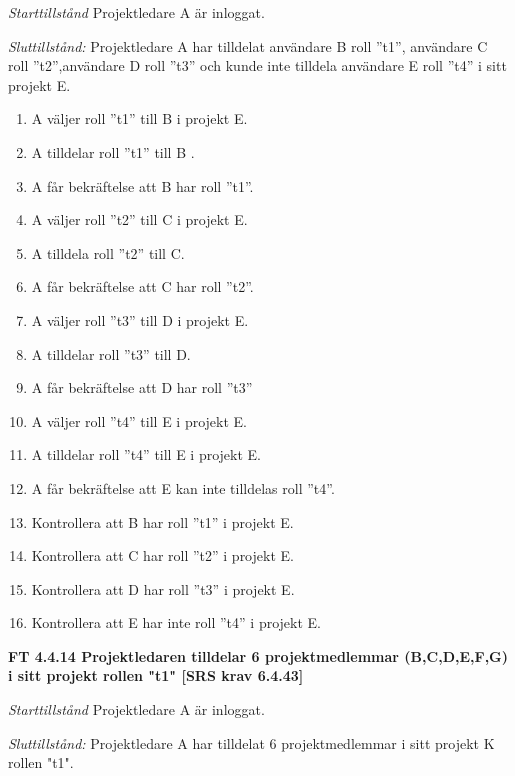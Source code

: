 \documentclass[a4paper]{article}
\begin{document}
\emph{Starttillstånd} Projektledare A är inloggat.

\emph{Sluttillstånd:} Projektledare A  har tilldelat användare B roll ”t1”, användare C roll ”t2”,användare D roll ”t3” och kunde inte tilldela användare E roll ”t4” i sitt projekt E.

\begin{enumerate}
\item A väljer roll ”t1” till B i projekt E.
\item A tilldelar roll ”t1” till B .
\item A får bekräftelse att  B har roll ”t1”.
\item A väljer roll ”t2” till C i projekt E.
\item A tilldela roll ”t2” till C.
\item A får bekräftelse att C har roll ”t2”.
\item A väljer roll ”t3” till D i projekt E.
\item A tilldelar roll ”t3” till D.
\item A får bekräftelse att D har roll ”t3”
\item A väljer roll ”t4” till E i projekt E.
\item A tilldelar roll ”t4” till E i projekt E.
\item A får bekräftelse att E kan inte tilldelas roll ”t4”.
\item Kontrollera att B har roll ”t1” i projekt E.
\item Kontrollera att C har roll ”t2” i projekt E.
\item Kontrollera att D har roll ”t3” i projekt E.
\item Kontrollera att E har inte roll ”t4” i projekt E.
\end{enumerate}

\textbf{FT 4.4.14 Projektledaren tilldelar 6 projektmedlemmar (B,C,D,E,F,G) i sitt projekt rollen "t1" [SRS krav 6.4.43]}

\emph{Starttillstånd} Projektledare A är inloggat.

\emph{Sluttillstånd:} Projektledare A  har tilldelat 6 projektmedlemmar i sitt projekt K  rollen "t1".
\end{document}
